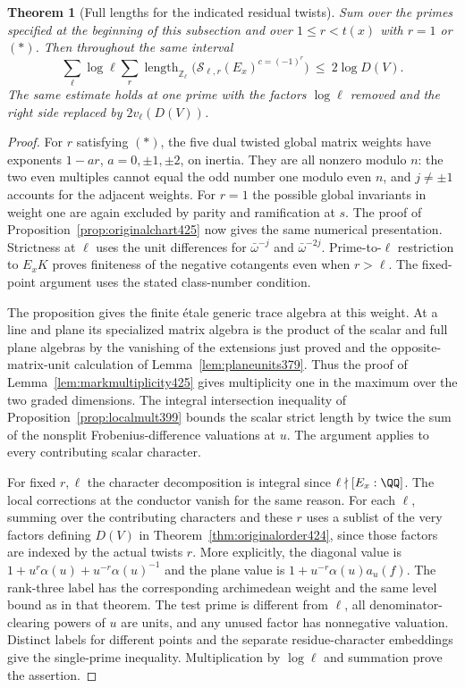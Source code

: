 \documentclass[a4paper,11pt]{article}
\newtheorem{theorem}[proposition]{Theorem}
\theoremstyle{definition}
\theoremstyle{remark}
\newcommand{\ZZ}{\mathbb Z}\newcommand{\ord}{\operatorname{ord}}
\numberwithin{equation}{section}
\begin{document}
\begin{theorem}[Full lengths for the indicated residual twists]\leavevmode
\label{thm:regularlength426}
Sum over the primes specified at the beginning of this
subsection and over \(1\le r<t(x)\) with \(r=1\) or \((*)\).
Then throughout the same interval
\[
 \sum_{\ell}\log\ell\sum_{r}
      \operatorname{length}_{\ZZ_\ell}
        \bigl(\mathcal S_{\ell,r}(E_x)^{c=(-1)^r}\bigr)
                       \ \le\ 2\log D(V).
\]
The same estimate holds at one prime with the factors
\(\log\ell\) removed and the right side replaced by
\(2v_\ell(D(V))\).
\end{theorem}
\begin{proof}
For \(r\) satisfying \((*)\), the five dual twisted global
matrix weights have exponents \(1-ar\), \(a=0,\pm1,\pm2\),
on inertia. They are all nonzero modulo \(n\): the two
even multiples cannot equal the odd number one modulo even
\(n\), and \(j\ne\pm1\) accounts for the adjacent weights.
For \(r=1\) the possible global invariants in weight one
are again excluded by parity and ramification at \(s\).
The proof of Proposition~\ref{prop:originalchart425} now gives
the same numerical presentation. Strictness at \(\ell\)
uses the unit differences for \(\bar\omega^{-j}\) and
\(\bar\omega^{-2j}\). Prime-to-\(\ell\) restriction to
\(E_xK\) proves finiteness of the negative cotangents even
when \(r>\ell\). The fixed-point argument uses the stated
class-number condition.

The proposition gives the finite \'{e}tale generic trace
algebra at this weight. At a line and plane its specialized
matrix algebra is the product of the scalar and full plane
algebras by the vanishing of the extensions just proved
and the opposite-matrix-unit calculation of
Lemma~\ref{lem:planeunits379}. Thus the proof of
Lemma~\ref{lem:markmultiplicity425} gives multiplicity one
in the maximum over the two graded dimensions. The integral
intersection inequality of Proposition~\ref{prop:localmult399}
bounds the scalar strict length by twice the sum of the
nonsplit Frobenius-difference valuations at \(u\). The
argument applies to every contributing scalar character.

For fixed \(r,\ell\) the character decomposition is integral
since \(\ell\nmid[E_x:\QQ]\). The local corrections at the
conductor vanish for the same reason. For each \(\ell\),
summing over the contributing characters and these \(r\)
uses a sublist of the very factors defining \(D(V)\) in
Theorem~\ref{thm:originalorder424}, since those factors are
indexed by the actual twists \(r\).
More explicitly, the diagonal value is
\(1+u^r\alpha(u)+u^{-r}\alpha(u)^{-1}\) and the plane value
is \(1+u^{-r}\alpha(u)a_u(f)\). The rank-three label has
the corresponding archimedean weight and the same level
bound as in that theorem. The test prime is different from
\(\ell\), all denominator-clearing powers of \(u\) are units,
and any unused factor has nonnegative valuation. Distinct
labels for different points and the separate residue-character
embeddings give the single-prime inequality. Multiplication
by \(\log\ell\) and summation prove the assertion.
\end{proof}
\end{document}
